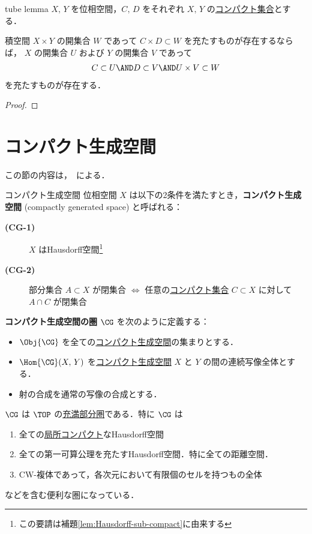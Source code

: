 \documentclass[algtopo_main]{subfiles}
\begin{document}
\begin{mylem}[label=lem:prod-compact]{tube lemma}
    $X,\, Y$ を位相空間，$C,\, D$ をそれぞれ $X,\, Y$ の\hyperref[def:compact]{コンパクト集合}とする．

    積空間 $X \times Y$ の開集合 $W$ であって $C \times D \subset W$ を充たすものが存在するならば，
    $X$ の開集合 $U$ および $Y$ の開集合 $V$ であって
    \begin{align}
        C \subset U \AND D \subset V \AND U \times V \subset W
    \end{align}
    を充たすものが存在する．
\end{mylem}

\begin{proof}
    
\end{proof}


\section{コンパクト生成空間}

この節の内容は，~\cite{Steenrod67}による．

\begin{mydef}[label=def:CG, breakable]{コンパクト生成空間}
    位相空間 $X$ は以下の2条件を満たすとき，\textbf{コンパクト生成空間} (compactly generated space) と呼ばれる：
    \begin{description}
        \item[\textbf{(CG-1)}] $X$ はHausdorff空間\footnote{この要請は補題\ref{lem:Hausdorff-sub-compact}に由来する}
        \item[\textbf{(CG-2)}] 部分集合 $A \subset X$ が閉集合 $\iff$ 任意の\hyperref[def:compact]{コンパクト集合} $C \subset X$ に対して $A \cap C$ が閉集合
    \end{description}
\end{mydef}

\textbf{コンパクト生成空間の圏} $\CG$ を次のように定義する：
\begin{itemize}
    \item $\Obj{\CG}$ を全ての\hyperref[def:CG]{コンパクト生成空間}の集まりとする．
    \item $\Hom{\CG}(X,\, Y)$ を\hyperref[def:CG]{コンパクト生成空間} $X$ と $Y$ の間の連続写像全体とする．
    \item 射の合成を通常の写像の合成とする．
\end{itemize}
$\CG$ は $\TOP$ の\hyperref[def:fullsub]{充満部分圏}である．特に
$\CG$ は
\begin{enumerate}
    \item 全ての\hyperref[def:loc-compact]{局所コンパクト}なHausdorff空間
    \item 全ての第一可算公理を充たすHausdorff空間．特に全ての距離空間．
    \item CW-複体であって，各次元において有限個のセルを持つもの全体
\end{enumerate}
などを含む便利な圏になっている．
\end{document}

